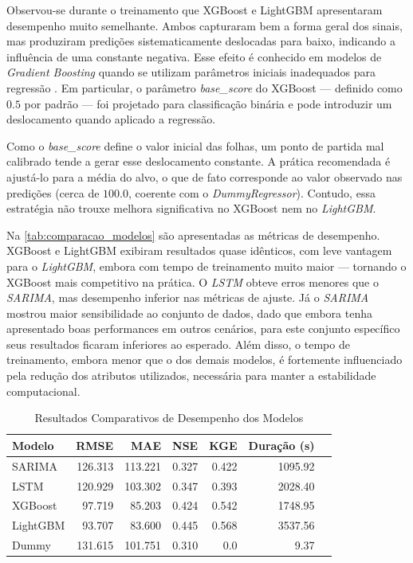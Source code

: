 Observou-se durante o treinamento que XGBoost e LightGBM apresentaram desempenho muito semelhante. Ambos capturaram bem
a forma geral dos sinais, mas produziram predições sistematicamente deslocadas para baixo, indicando a influência de uma
constante negativa. Esse efeito é conhecido em modelos de \textit{Gradient Boosting} quando se utilizam parâmetros
iniciais inadequados para regressão \cite{xgbase}. Em particular, o parâmetro \textit{base\_score} do XGBoost — definido
como $0.5$ por padrão — foi projetado para classificação binária e pode introduzir um deslocamento quando aplicado a
regressão.

Como o \textit{base\_score} define o valor inicial das folhas, um ponto de partida mal calibrado tende a gerar esse
deslocamento constante. A prática recomendada é ajustá-lo para a média do alvo, o que de fato corresponde ao valor
observado nas predições (cerca de $100.0$, coerente com o \textit{DummyRegressor}). Contudo, essa estratégia não trouxe
melhora significativa no XGBoost nem no \textit{LightGBM}.

Na \autoref{tab:comparacao_modelos} são apresentadas as métricas de desempenho. XGBoost e LightGBM exibiram resultados
quase idênticos, com leve vantagem para o \textit{LightGBM}, embora com tempo de treinamento muito maior — tornando o
XGBoost mais competitivo na prática. O \textit{LSTM} obteve erros menores que o \textit{SARIMA}, mas desempenho inferior
nas métricas de ajuste. Já o \textit{SARIMA} mostrou maior sensibilidade ao conjunto de dados, dado que embora tenha
apresentado boas performances em outros cenários, para este conjunto específico seus resultados ficaram inferiores ao
esperado. Além disso, o tempo de treinamento, embora menor que o dos demais modelos, é fortemente influenciado pela
redução dos atributos utilizados, necessária para manter a estabilidade computacional.

\begin{table}[h!]
    \centering
    \caption{Resultados Comparativos de Desempenho dos Modelos}
    \label{tab:comparacao_modelos}
    \begin{tabular}{|l|r|r|r|r|r|r|}
        \hline
        \textbf{Modelo} & \textbf{RMSE} & \textbf{MAE} & \textbf{NSE} & \textbf{KGE} & \textbf{Duração (s)} \\
        \hline \hline
        SARIMA & 126.313 & 113.221 & 0.327 & 0.422 & 1095.92 \\ \hline
        LSTM & 120.929 & 103.302 & 0.347 & 0.393 & 2028.40 \\ \hline
        XGBoost & 97.719 & 85.203 & 0.424 & 0.542 & 1748.95 \\ \hline
        LightGBM & 93.707 & 83.600 & 0.445 & 0.568 & 3537.56 \\ \hline
        Dummy & 131.615 & 101.751 & 0.310 & 0.0 & 9.37 \\ \hline
    \end{tabular}
\end{table}